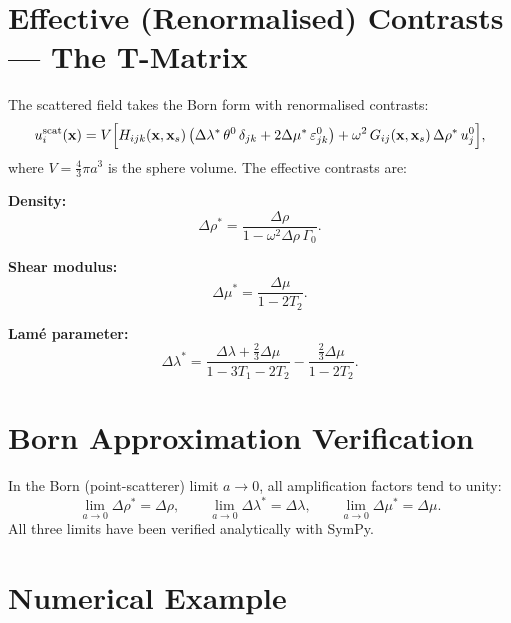 \section{Effective (Renormalised) Contrasts --- The T-Matrix}

The scattered field takes the Born form with renormalised contrasts:
\begin{equation}
  u_i^{\text{scat}}(\mathbf{x})
  = V\Bigl[
    H_{ijk}(\mathbf{x},\mathbf{x}_s)\,\bigl(
      \Delta\lambda^*\,\theta^0\,\delta_{jk}
      + 2\Delta\mu^*\,\varepsilon_{jk}^0\bigr)
    + \omega^2\,G_{ij}(\mathbf{x},\mathbf{x}_s)\,\Delta\rho^*\,u_j^0
  \Bigr],
\label{eq:scatBorn}
\end{equation}
where $V = \tfrac{4}{3}\pi a^3$ is the sphere volume.  The effective
contrasts are:

\medskip
\noindent\textbf{Density:}
\begin{equation}
  \Delta\rho^* = \frac{\Delta\rho}{1-\omega^2\Delta\rho\,\Gamma_0}.
\label{eq:Drhostar}
\end{equation}

\noindent\textbf{Shear modulus:}
\begin{equation}
  \Delta\mu^* = \frac{\Delta\mu}{1-2T_2}.
\label{eq:Dmustar}
\end{equation}

\noindent\textbf{Lam\'e parameter:}
\begin{equation}
  \Delta\lambda^* = \frac{\Delta\lambda + \tfrac{2}{3}\Delta\mu}
  {1 - 3T_1 - 2T_2}
  - \frac{\tfrac{2}{3}\Delta\mu}{1 - 2T_2}.
\label{eq:Dlamstar}
\end{equation}


\section{Born Approximation Verification}

In the Born (point-scatterer) limit $a\to 0$, all amplification factors
tend to unity:
\begin{equation}
  \lim_{a\to 0}\Delta\rho^* = \Delta\rho, \qquad
  \lim_{a\to 0}\Delta\lambda^* = \Delta\lambda, \qquad
  \lim_{a\to 0}\Delta\mu^* = \Delta\mu.
\label{eq:Bornlim}
\end{equation}
All three limits have been verified analytically with SymPy.


\section{Numerical Example}

